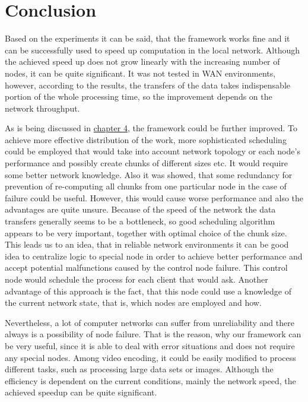 \chapter*{Conclusion}
Based on the experiments it can be said, that the framework works fine and it can be successfully used to speed up computation in the local network. Although the achieved speed up does not grow linearly with the increasing number of nodes, it can be quite significant. It was not tested in WAN environments, however, according to the results, the transfers of the data takes indispensable portion of the whole processing time, so the improvement depends on the network throughput. 

As is being discussed in \hyperref[Problems-alternatives-and-possible-improvements]{chapter 4}, the framework could be further improved. To achieve more effective distribution of the work, more sophisticated scheduling could be employed that would take into account network topology or each node's performance and possibly create chunks of different sizes etc. It would require some better network knowledge. Also it was showed, that some redundancy for prevention of re-computing all chunks from one particular node in the case of failure could be useful. However, this would cause worse performance and also the advantages are quite unsure. Because of the speed of the network the data transfers generally seems to be a bottleneck, so good scheduling algorithm appears to be very important, together with optimal choice of the chunk size. This leads us to an idea, that in reliable network environments it can be good idea to centralize logic to special node in order to achieve better performance and accept potential malfunctions caused by the control node failure. This control node would schedule the process for each client that would ask. Another advantage of this approach is the fact, that this node could use a knowledge of the current network state, that is, which nodes are employed and how.

Nevertheless, a lot of computer networks can suffer from unreliability and there always is a possibility of node failure. That is the reason, why our framework can be very useful, since it is able to deal with error situations and does not require any special nodes. Among video encoding, it could be easily modified to process different tasks, such as processing large data sets or images. Although the efficiency is dependent on the current conditions, mainly the network speed, the achieved speedup can be quite significant.